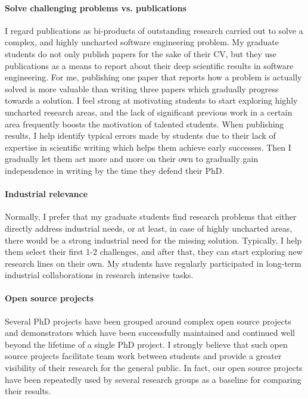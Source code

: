 \paragraph{Solve challenging problems vs. publications}
I regard publications as bi-products of outstanding research carried out to solve a complex, and highly uncharted software engineering problem. My graduate students do not only publish papers for the sake of their CV, but they use publications as a means to report about their deep scientific results in software engineering. For me, publishing one paper that reports how a problem is actually solved is more valuable than writing three papers which gradually progress towards a solution. I feel strong at motivating students to start exploring highly uncharted research areas, and the lack of significant previous work in a certain area frequently boosts the motivation of talented students. 
When publishing results, I help identify typical errors made by students due to their lack of expertise in scientific writing which helps them achieve early successes. Then I gradually let them act more and more on their own to gradually gain independence in writing by the time they defend their PhD. 

\paragraph{Industrial relevance}
Normally, I prefer that my graduate students find research problems that either directly address industrial needs, or at least, in case of highly uncharted areas, there would be a strong industrial need for the missing solution. Typically, I help them select their first 1-2 challenges, and after that, they can start exploring new research lines on their own. 
My students have regularly participated in long-term industrial collaborations in research intensive tasks. 

\paragraph{Open source projects}
Several PhD projects have been grouped around complex open source projects and demonstrators which have been successfully maintained and continued well beyond the lifetime of a single PhD project. I strongly believe that such open source projects facilitate team work between students and provide a greater visibility of their research for the general public. In fact, our open source projects have been repeatedly used by several research groups as a baseline for comparing their results. 

